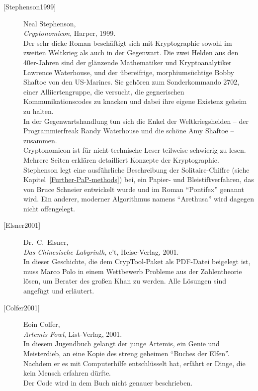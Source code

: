 \begin{description}
\item[\textrm{[Stephenson1999]}] 
    Neal Stephenson, \\
    {\em Cryptonomicon}, Harper, 1999. \\
    Der sehr dicke Roman beschäftigt sich mit Kryptographie sowohl im
    zweiten Weltkrieg als auch in der Gegenwart.
    Die zwei Helden aus den 40er-Jahren sind der glänzende Mathematiker und
    Kryptoanalytiker Lawrence Waterhouse, und der übereifrige,
    morphiumsüchtige Bobby Shaftoe von den US-Marines.
    Sie gehören zum Sonderkommando 2702, einer Alliiertengruppe, die
    versucht, die gegnerischen Kommunikationscodes zu knacken und dabei
    ihre eigene Existenz geheim zu halten. \\
    In der Gegenwartshandlung tun sich die Enkel der Weltkriegshelden -- der
    Programmierfreak Randy Waterhouse und die schöne Amy Shaftoe -- zusammen. \\
    Cryptonomicon ist für nicht-technische Leser teilweise schwierig zu
    lesen. Mehrere Seiten erklären detailliert Konzepte der Kryptographie.
    Stephenson legt eine ausführliche Beschreibung der Solitaire-Chiffre
    (siehe Kapitel~\ref{Further-PaP-methods}) bei, ein
    Papier- und Bleistiftverfahren,
    das von Bruce Schneier entwickelt wurde und im
    Roman "`Pontifex"' genannt wird. Ein anderer, moderner Algorithmus
    namens "`Arethusa"' wird dagegen nicht offengelegt.\\


\item[\textrm{[Elsner2001]}] 
    Dr.~C.~Elsner, \nopagebreak\\
    {\em Das Chinesische Labyrinth}, c't, Heise-Verlag, 2001. \\
    In dieser Geschichte, die dem CrypTool-Paket als PDF-Datei
    beigelegt ist, muss Marco Polo in einem Wettbewerb Probleme aus der
    Zahlentheorie lösen, um Berater des großen Khan zu werden. Alle Lösungen
    sind angefügt und erläutert.\\


\item[\textrm{[Colfer2001]}] 
    Eoin Colfer, \\
    {\em Artemis Fowl}, List-Verlag, 2001. \\
    In diesem Jugendbuch gelangt der junge Artemis, ein Genie und Meisterdieb,
    an eine Kopie des streng geheimen "`Buches der Elfen"'. Nachdem er es mit
    Computerhilfe entschlüsselt hat, erfährt er Dinge, die kein Mensch
    erfahren dürfte. \\
    Der Code wird in dem Buch nicht genauer beschrieben.\\



\end{description}
